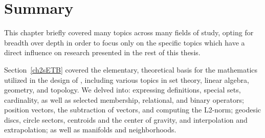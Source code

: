 %
%

%
%
%
%
%
%
\section{Summary}
This chapter briefly covered many topics across many fields of study, opting for breadth over depth in order to focus only on the specific topics which have a direct influence on research presented in the rest of this thesis.

Section~\ref{ch2sETB} covered the elementary, theoretical basis for the mathematics utilized in the design of , including various topics in set theory, linear algebra, geometry, and topology. We delved into: expressing definitions, special sets, cardinality, as well as selected membership, relational, and binary operators; position vectors, the subtraction of vectors, and computing the L2-norm; geodesic discs, circle sectors, centroids and the center of gravity, and interpolation and extrapolation; as well as manifolds and neighborhoods.

